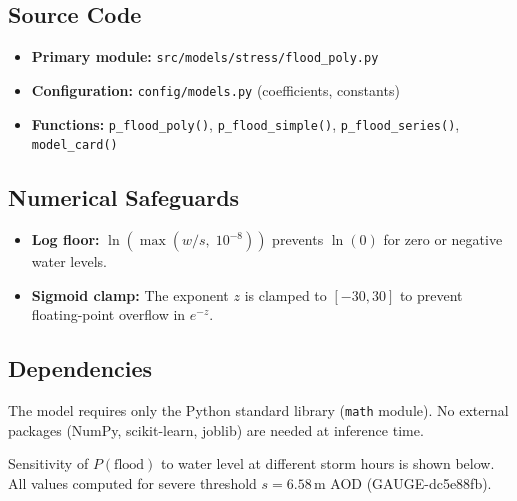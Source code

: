 \documentclass[11pt,a4paper]{article}
\begin{document}
\subsection{Source Code}
\begin{itemize}[nosep]
    \item \textbf{Primary module:} \texttt{src/models/stress/flood\_poly.py}
    \item \textbf{Configuration:} \texttt{config/models.py} (coefficients,
          constants)
    \item \textbf{Functions:} \texttt{p\_flood\_poly()},
          \texttt{p\_flood\_simple()}, \texttt{p\_flood\_series()},
          \texttt{model\_card()}
\end{itemize}

\subsection{Numerical Safeguards}
\begin{itemize}[nosep]
    \item \textbf{Log floor:} $\ln(\max(w/s,\; 10^{-8}))$ prevents
          $\ln(0)$ for zero or negative water levels.
    \item \textbf{Sigmoid clamp:} The exponent $z$ is clamped to
          $[-30, 30]$ to prevent floating-point overflow in $e^{-z}$.
\end{itemize}

\subsection{Dependencies}
The model requires only the Python standard library (\texttt{math} module).
No external packages (NumPy, scikit-learn, joblib) are needed at inference time.

\mkmsensitivity

Sensitivity of $P(\text{flood})$ to water level at different storm hours is
shown below. All values computed for severe threshold $s = 6.58$\,m AOD
(GAUGE-dc5e88fb).



\mkmlimitations
\end{document}
